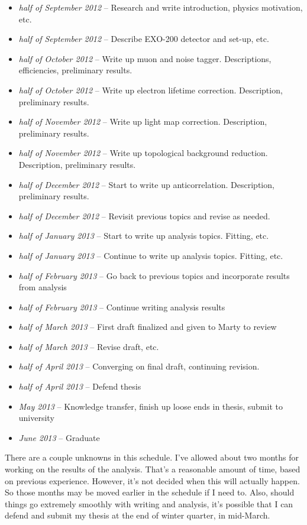 \documentclass[12pt,letterpaper,onecolumn]{article}
\begin{document}
\begin{itemize}
\item \textit{ half of September 2012} -- Research and write introduction, physics motivation, etc.
\item \textit{ half of September 2012} -- Describe EXO-200 detector and set-up, etc.
\item \textit{ half of October 2012} -- Write up muon and noise tagger. Descriptions, efficiencies, preliminary results.
\item \textit{ half of October 2012} -- Write up electron lifetime correction. Description, preliminary results.
\item \textit{ half of November 2012} -- Write up light map correction. Description, preliminary results.
\item \textit{ half of November 2012} -- Write up topological background reduction. Description, preliminary results.
\item \textit{ half of December 2012} -- Start to write up anticorrelation. Description, preliminary results.
\item \textit{ half of December 2012} -- Revisit previous topics and revise as needed.
\item \textit{ half of January 2013} -- Start to write up analysis topics. Fitting, etc.
\item \textit{ half of January 2013} -- Continue to write up analysis topics. Fitting, etc.
\item \textit{ half of February 2013} -- Go back to previous topics and incorporate results from analysis
\item \textit{ half of February 2013} -- Continue writing analysis results
\item \textit{ half of March 2013} -- First draft finalized and given to Marty to review
\item \textit{ half of March 2013} -- Revise draft, etc.
\item \textit{ half of April 2013} -- Converging on final draft, continuing revision.
\item \textit{ half of April 2013} -- Defend thesis
\item \textit{May 2013} -- Knowledge transfer, finish up loose ends in thesis, submit to university
\item \textit{June 2013} -- Graduate
\end{itemize}

There are a couple unknowns in this schedule. I've allowed about two months for working on the results of the analysis. That's a reasonable amount of time, based on previous experience. However, it's not decided when this will actually happen. So those months may be moved earlier in the schedule if I need to. Also, should things go extremely smoothly with writing and analysis, it's possible that I can defend and submit my thesis at the end of winter quarter, in mid-March.
\end{document}
